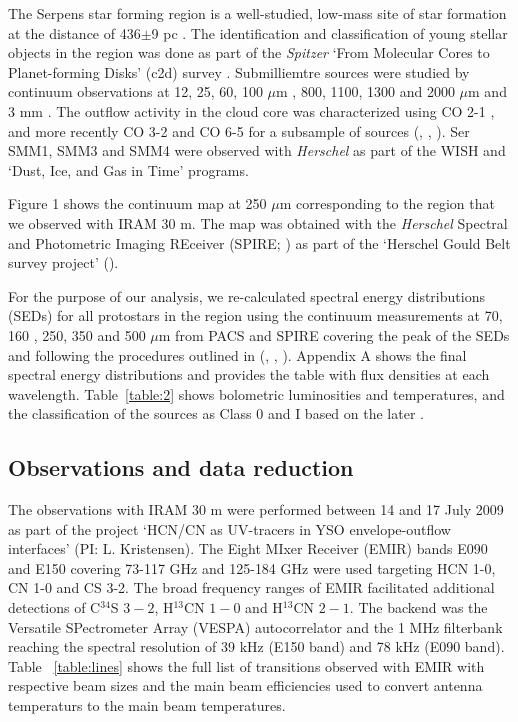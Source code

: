 \documentclass{aa}
\begin{document}
The Serpens star forming region is a well-studied, low-mass site of star formation at the 
distance of 436$\pm$9 pc \citep{Ort17}. The identification and classification of young 
stellar objects in the region was done as part of the \textit{Spitzer} ‘From Molecular Cores to
Planet-forming Disks’ (c2d) survey \citep{Har07,Eno09,Eva09,Dun15}. 
Submilliemtre sources were studied by continuum observations at 12, 25, 60, 100 $\mu$m \citep{Hur96}, 800, 1100, 1300 and 2000 $\mu$m \citep{Cas93} and 3 mm \citep{Tes98}. The outflow activity in the cloud core was characterized using CO 2-1 \citep{Dav99}, and 
more recently CO 3-2 and CO 6-5 for a subsample of sources (\citealt{Gra10}, \citealt{Dio10}, \citealt{Yil15}). Ser SMM1, SMM3 and 
SMM4 were observed with \textit{Herschel} as part of the WISH and `Dust, Ice, and Gas in Time' 
\citep[DIGIT,][]{Gre13,Gre16,YL18} programs. 

Figure 1 shows the continuum map at 250 $\mu$m corresponding to the region that we observed with 
IRAM 30 m. The map was obtained with the \textit{Herschel} Spectral and Photometric Imaging 
REceiver (SPIRE; \citealt{Gri10}) as part of the ‘Herschel Gould Belt survey project' (\citealt{And10}). 

For the purpose of our analysis, we re-calculated spectral energy distributions (SEDs) for 
all protostars in the region using the continuum measurements at 70, 160 , 250, 350 and 500 $\mu$m 
from PACS and SPIRE covering the peak of the SEDs and following the procedures outlined in (\citealt{And10}, \citealt{Kir13}, \citealt{Kon15}).
Appendix A shows the final spectral energy distributions and provides the table with
flux densities at each wavelength. Table~\ref{table:2} shows bolometric luminosities
and temperatures, and the classification of the sources as 
Class 0 and I based on the later \citep{Eva09}.

\subsection{Observations and data reduction}
 
The observations with IRAM 30 m were performed between 14 and 17 July 2009 as part of the project ‘HCN/CN as UV-tracers in YSO envelope-outflow interfaces’ (PI: L. Kristensen). The Eight MIxer Receiver (EMIR) bands E090 and E150 covering 73-117 GHz and 125-184 GHz were used targeting HCN 1-0, CN 1-0 and CS 3-2. The broad frequency ranges of EMIR facilitated additional detections 
of C$^{34}$S $3-2$, H$^{13}$CN $1-0$ and H$^{13}$CN $2-1$. The
backend was the Versatile SPectrometer Array (VESPA) autocorrelator and the 1 MHz filterbank
reaching the spectral resolution of 39 kHz (E150 band) and 78 kHz (E090 band).
Table ~\ref{table:lines} shows the full list of transitions observed with EMIR with 
respective beam sizes and the main beam efficiencies used to convert antenna temperaturs 
to the main beam temperatures. 
\end{document}

